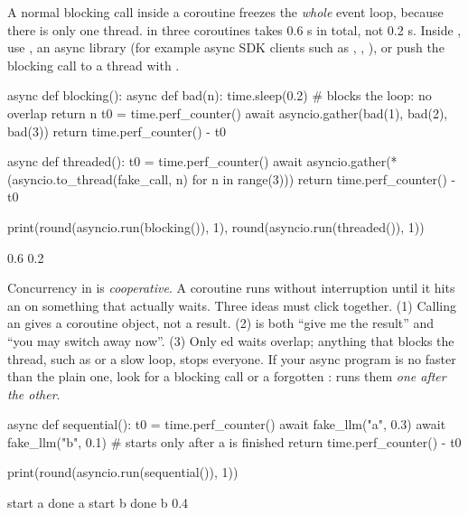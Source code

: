 \begin{trap}
A normal blocking call inside a coroutine freezes the \emph{whole} event loop, because there is
only one thread.  in three coroutines takes 0.6 s in total, not 0.2 s.
Inside , use , an async library (for example async SDK
clients such as , , ), or push the blocking
call to a thread with .
\end{trap}

\begin{pycode}
async def blocking():
    async def bad(n):
        time.sleep(0.2)               # blocks the loop: no overlap
        return n
    t0 = time.perf_counter()
    await asyncio.gather(bad(1), bad(2), bad(3))
    return time.perf_counter() - t0

async def threaded():
    t0 = time.perf_counter()
    await asyncio.gather(*(asyncio.to_thread(fake_call, n) for n in range(3)))
    return time.perf_counter() - t0

print(round(asyncio.run(blocking()), 1), round(asyncio.run(threaded()), 1))
\end{pycode}
\begin{rawcode}
0.6 0.2
\end{rawcode}

\begin{boss}
Concurrency in  is \emph{cooperative}. A coroutine runs without interruption until it
hits an  on something that actually waits. Three ideas must click together. (1)
Calling an  gives a coroutine object, not a result. (2)  is both ``give
me the result'' and ``you may switch away now''. (3) Only ed waits overlap; anything
that blocks the thread, such as  or a slow loop, stops everyone. If your async
program is no faster than the plain one, look for a blocking call or a forgotten :
 runs them \emph{one after the other}.
\end{boss}

\begin{pycode}
async def sequential():
    t0 = time.perf_counter()
    await fake_llm("a", 0.3)
    await fake_llm("b", 0.1)          # starts only after a is finished
    return time.perf_counter() - t0

print(round(asyncio.run(sequential()), 1))
\end{pycode}
\begin{rawcode}
start a
done a
start b
done b
0.4
\end{rawcode}

